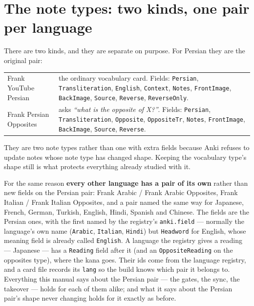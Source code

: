 \documentclass[11pt,oneside]{report}
\begin{document}
\section{The note types: two kinds, one pair per language}
\label{sec:notetypes}

There are two kinds, and they are separate on purpose. For Persian they are
the original pair:

\begin{center}
\begin{tabular}{@{}p{}p{}@{}}
\toprule
\textsf{Frank YouTube Persian} & the ordinary vocabulary card. Fields:
  \texttt{Persian}, \texttt{Transliteration}, \texttt{English},
  \texttt{Context}, \texttt{Notes}, \texttt{FrontImage}, \texttt{BackImage},
  \texttt{Source}, \texttt{Reverse}, \texttt{ReverseOnly}. \\
\addlinespace
\textsf{Frank Persian Opposites} & asks \emph{``what is the opposite of
  X?''}. Fields: \texttt{Persian}, \texttt{Transliteration},
  \texttt{Opposite}, \texttt{OppositeTr}, \texttt{Notes},
  \texttt{FrontImage}, \texttt{BackImage}, \texttt{Source},
  \texttt{Reverse}. \\
\bottomrule
\end{tabular}
\end{center}

They are two note types rather than one with extra fields because Anki
refuses to update notes whose note type has changed shape. Keeping the
vocabulary type's shape still is what protects everything already studied
with it.

For the same reason \textbf{every other language has a pair of its own}
rather than new fields on the Persian pair: \textsf{Frank Arabic} /
\textsf{Frank Arabic Opposites}, \textsf{Frank Italian} /
\textsf{Frank Italian Opposites}, and a pair named the same way for
Japanese, French, German, Turkish, English, Hindi, Spanish and Chinese. The
fields are the Persian ones, with the first named by the registry's
\texttt{anki.field} --- normally the language's own name (\texttt{Arabic},
\texttt{Italian}, \texttt{Hindi}) but \texttt{Headword} for English, whose
meaning field is already called \texttt{English}. A language the registry
gives a reading --- Japanese --- has a \texttt{Reading} field after it
(and an \texttt{OppositeReading} on the opposites type), where the kana
goes. Their ids come from the language registry, and a card file records
its \texttt{lang} so the build knows which pair it belongs to. Everything
this manual says about the Persian pair --- the gates, the sync, the
takeover --- holds for each of them alike; and what it says about the
Persian pair's shape never changing holds for it exactly as before.
\end{document}
